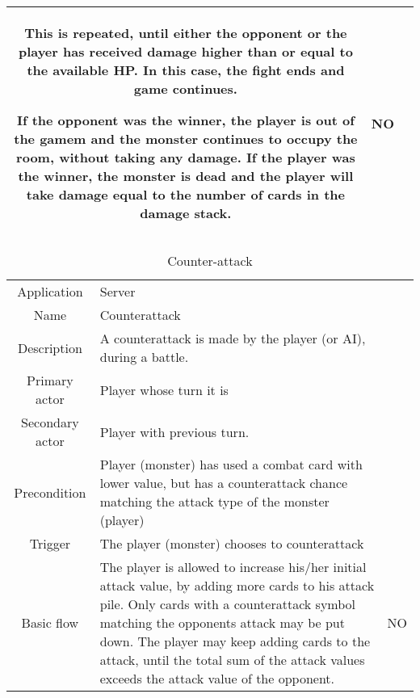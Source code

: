 \documentclass[a4paper,10pt]{report}
\begin{document}
\begin{table}
\begin{tabular}{|c| p{9cm}|c}
This is repeated, until either the opponent or the player has received damage higher than or equal to the available HP. In this case, the fight ends and game continues.

If the opponent was the winner, the player is out of the gamem and the monster continues to occupy the room, without taking any damage. If the player was the winner, the monster is dead and the player will take damage equal to the number of cards in the damage stack.

& NO \\



\hline
\end{tabular}
\end{table}

\begin{table}
\caption{Counter-attack}
\label{fight_counterattack}
\begin{tabular}{|c| p{9cm}|c}
\hline
Application & Server & \\
Name & Counterattack & \\
Description & A counterattack is made by the player (or AI), during a battle. & \\
Primary actor & Player whose turn it is & \\
Secondary actor & Player with previous turn.& \\
Precondition & Player (monster) has used a combat card with lower value, but has a counterattack chance matching the attack type of the monster (player)& \\
Trigger & The player (monster) chooses to counterattack  & \\ \hline
Basic flow & The player is allowed to increase his/her initial attack value, by adding more cards to his attack pile. Only cards with a counterattack symbol matching the opponents attack may be put down. The player may keep adding cards to the attack, until the total sum of the attack values exceeds the attack value of the opponent.& NO\\
\hline
\end{tabular}
\end{table}
\end{document}
